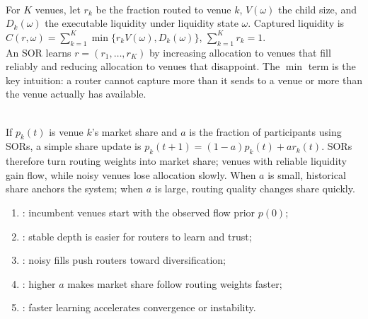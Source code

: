 \begin{model} \\
For $K$ venues, let $r_k$ be the fraction routed to venue $k$, $V(\omega)$ the child size, and $D_k(\omega)$ the executable liquidity under liquidity state $\omega$. Captured liquidity is $C(r,\omega)=\sum\limits_{k=1}^{K}\min\{r_kV(\omega),D_k(\omega)\}$, $\sum\limits_{k=1}^{K}r_k=1$.\\
An SOR learns $r=(r_1,\ldots,r_K)$ by increasing allocation to venues that fill reliably and reducing allocation to venues that disappoint. The $\min$ term is the key intuition: a router cannot capture more than it sends to a venue or more than the venue actually has available.
\end{model}

\begin{mechanism} \\
If $p_k(t)$ is venue $k$'s market share and $a$ is the fraction of participants using SORs, a simple share update is $p_k(t+1)=(1-a)p_k(t)+a r_k(t)$. SORs therefore turn routing weights into market share; venues with reliable liquidity gain flow, while noisy venues lose allocation slowly. When $a$ is small, historical share anchors the system; when $a$ is large, routing quality changes share quickly.
\end{mechanism}

\begin{taxonomy} 
\begin{enumerate}[label=\roman*.]
\setlength{\itemsep}{0pt}
\item {}: incumbent venues start with the observed flow prior $p(0)$;
\item {}: stable depth is easier for routers to learn and trust;
\item {}: noisy fills push routers toward diversification;
\item {}: higher $a$ makes market share follow routing weights faster;
\item {}: faster learning accelerates convergence or instability.
\end{enumerate}
\end{taxonomy}

